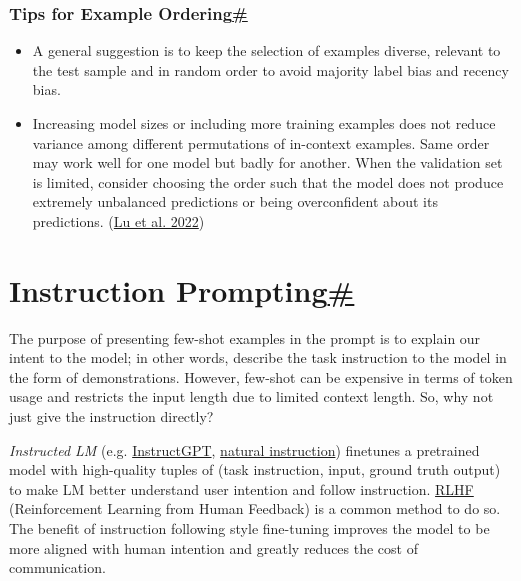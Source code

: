 \subsubsection{\texorpdfstring{Tips for Example Ordering\hyperref[tips-for-example-ordering]{\#}}{Tips for Example Ordering\#}}\label{tips-for-example-ordering}

\begin{itemize}
\tightlist
\item
  A general suggestion is to keep the selection of examples diverse, relevant to the test sample and in random order to avoid majority label bias and recency bias.
\item
  Increasing model sizes or including more training examples does not reduce variance among different permutations of in-context examples. Same order may work well for one model but badly for another. When the validation set is limited, consider choosing the order such that the model does not produce extremely unbalanced predictions or being overconfident about its predictions. (\href{https://arxiv.org/abs/2104.08786}{Lu et al. 2022})
\end{itemize}

\section{\texorpdfstring{Instruction Prompting\hyperref[instruction-prompting]{\#}}{Instruction Prompting\#}}\label{instruction-prompting}

The purpose of presenting few-shot examples in the prompt is to explain our intent to the model; in other words, describe the task instruction to the model in the form of demonstrations. However, few-shot can be expensive in terms of token usage and restricts the input length due to limited context length. So, why not just give the instruction directly?

\emph{Instructed LM} (e.g. \href{https://openai.com/research/instruction-following}{InstructGPT}, \href{https://github.com/allenai/natural-instructions}{natural instruction}) finetunes a pretrained model with high-quality tuples of (task instruction, input, ground truth output) to make LM better understand user intention and follow instruction. \href{https://lilianweng.github.io/posts/2021-01-02-controllable-text-generation/\#rl-fine-tuning-with-human-preferences}{RLHF} (Reinforcement Learning from Human Feedback) is a common method to do so. The benefit of instruction following style fine-tuning improves the model to be more aligned with human intention and greatly reduces the cost of communication.


